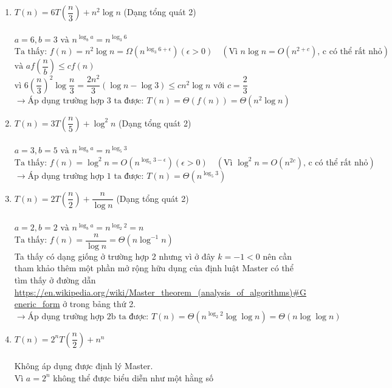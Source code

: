 \documentclass[12pt, letterpaper]{article}
\begin{document}
\begin{enumerate}[label=\bfseries\large\theenumi.]
    \item $ T(n) = 6T\left( \dfrac{n}{3} \right) + n^2 \log n $ (Dạng tổng quát 2) \\ \\
        $ a = 6, b = 3 \text{ và } n^{\log_b a} = n^{\log_3 6} $ \\
        $ \text{Ta thấy: } f(n) = n^2 \log n = \Omega(n^{\log_3 6 + \epsilon}) (\epsilon > 0) \quad (\text{Vì } n \log n = O(n^{2+c}) \text{, c có thể rất nhỏ}) $\\
        $ \text{và } af\left(\dfrac{n}{b}\right) \leq cf(n) $ \\
        $ \text{vì } 6{(\dfrac{n}{3})}^2 \log \dfrac{n}{3} = \dfrac{2n^2}{3}(\log n - \log 3) \leq c n^2 \log n \text{ với } c = \dfrac{2}{3} $ \\
        $ \rightarrow \text{Áp dụng trường hợp 3 ta được: } T(n) = \Theta(f(n)) = \Theta(n^2 \log n) $

    \item $ T(n) = 3T\left( \dfrac{n}{5} \right) + \log^2 n $ (Dạng tổng quát 2) \\ \\
        $ a = 3, b = 5 \text{ và } n^{\log_b a} = n^{\log_5 3} $ \\
        $ \text{Ta thấy: } f(n) = \log^2 n = O(n^{\log_5 3 - \epsilon}) (\epsilon > 0) \quad (\text{Vì } \log^2 n = O(n^{2c}) \text{, c có thể rất nhỏ})$ \\
        $ \rightarrow \text{Áp dụng trường hợp 1 ta được: } T(n) = \Theta(n^{\log_5 3}) $

    \item $ T(n) = 2T\left( \dfrac{n}{2} \right) + \dfrac{n}{\log n} $ (Dạng tổng quát 2) \\ \\
        $ a = 2, b = 2 \text{ và } n^{\log_b a} = n^{\log_2 2} = n $ \\
        $ \text{Ta thấy: } f(n) = \dfrac{n}{\log n} = \Theta(n \log^{-1} n) $ \\
        Ta thấy có dạng giống ở trường hợp 2 nhưng vì ở đây $ k = -1 < 0 $ nên cần tham khảo thêm
        một phần mở rộng hữu dụng của định luật Master có thể tìm thấy ở đường dẫn
        \url{https://en.wikipedia.org/wiki/Master_theorem_(analysis_of_algorithms)#Generic_form}
        ở trong bảng thứ 2. \\
        $ \rightarrow \text{Áp dụng trường hợp 2b ta được: } T(n) = \Theta(n^{\log_2 2} \log\log n) = \Theta(n\log\log n) $

    \item $ T(n) = 2^n T\left( \dfrac{n}{2} \right) + n^n $ \\ \\
        Không áp dụng được định lý Master. \\
        Vì $ a = 2^n $ không thể được biểu diễn như một hằng số \\


\end{enumerate}
\end{document}
